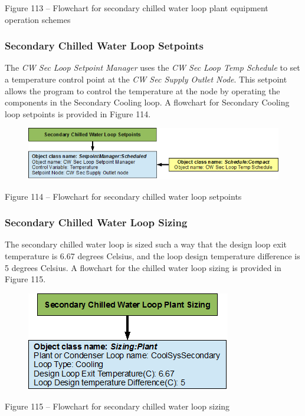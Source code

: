 Figure 113 -- Flowchart for secondary chilled water loop plant equipment operation schemes

\subsubsection{Secondary Chilled Water Loop Setpoints}\label{secondary-chilled-water-loop-setpoints}

The \emph{CW Sec Loop Setpoint Manager} uses the \emph{CW Sec Loop Temp Schedule} to set a temperature control point at the \emph{CW Sec Supply Outlet Node}. This setpoint allows the program to control the temperature at the node by operating the components in the Secondary Cooling loop. A flowchart for Secondary Cooling loop setpoints is provided in Figure 114.

\begin{figure}[htbp]
\centering
\includegraphics{media/image114.png}
\caption{}
\end{figure}

Figure 114 -- Flowchart for secondary chilled water loop setpoints

\subsubsection{Secondary Chilled Water Loop Sizing}\label{secondary-chilled-water-loop-sizing}

The secondary chilled water loop is sized such a way that the design loop exit temperature is 6.67 degrees Celsius, and the loop design temperature difference is 5 degrees Celsius. A flowchart for the chilled water loop sizing is provided in Figure 115.

\begin{figure}[htbp]
\centering
\includegraphics{media/image115.png}
\caption{}
\end{figure}

Figure 115 -- Flowchart for secondary chilled water loop sizing
